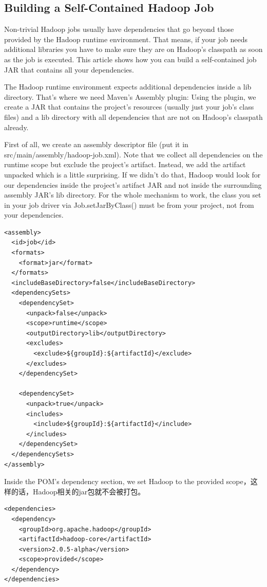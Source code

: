 \subsection{Building a Self-Contained Hadoop Job}
\par Non-trivial Hadoop jobs usually have dependencies that go beyond those provided by the Hadoop runtime environment. That means, if your job needs additional libraries you have to make sure they are on Hadoop’s classpath as soon as the job is executed. This article shows how you can build a self-contained job JAR that contains all your dependencies.
\par The Hadoop runtime environment expects additional dependencies inside a lib directory. That’s where we need Maven’s Assembly plugin: Using the plugin, we create a JAR that contains the project’s resources (usually just your job’s class files) and a lib directory with all dependencies that are not on Hadoop’s classpath already.
\par First of all, we create an assembly descriptor file (put it in {\color{red}src/main/assembly/hadoop-job.xml}). Note that we collect all dependencies on the runtime scope but exclude the project’s artifact. Instead, we add the artifact unpacked which is a little surprising. If we didn’t do that, Hadoop would look for our dependencies inside the project’s artifact JAR and not inside the surrounding assembly JAR's lib directory. For the whole mechanism to work, the class you set in your job driver via Job.setJarByClass() must be from your project, not from your dependencies.
\begin{verbatim}
<assembly>
  <id>job</id>
  <formats>
    <format>jar</format>
  </formats>
  <includeBaseDirectory>false</includeBaseDirectory>
  <dependencySets>
    <dependencySet>
      <unpack>false</unpack>
      <scope>runtime</scope>
      <outputDirectory>lib</outputDirectory>
      <excludes>
        <exclude>${groupId}:${artifactId}</exclude>
      </excludes>
    </dependencySet>

    <dependencySet>
      <unpack>true</unpack>
      <includes>
        <include>${groupId}:${artifactId}</include>
      </includes>
    </dependencySet>
  </dependencySets>
</assembly>
\end{verbatim}
\par Inside the POM's dependency section, we set Hadoop to the {\color{red}provided} scope，这样的话，Hadoop相关的jar包就不会被打包。
\begin{verbatim}
<dependencies>
  <dependency>
    <groupId>org.apache.hadoop</groupId>
    <artifactId>hadoop-core</artifactId>
    <version>2.0.5-alpha</version>
    <scope>provided</scope>
  </dependency>
</dependencies>
\end{verbatim}

